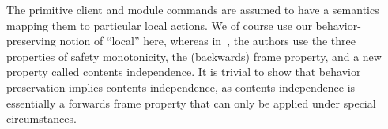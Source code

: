 \begin{comment}
\ifextended
In the language, we abstract out the syntax of the boolean expression type $B$, and
assume we have a denotational semantics for boolean expressions (written $\den{B}$) mapping
program states to boolean values. Furthermore, this semantics is required to have the 
following simple locality property:
\[\forall \sigma_0, \sigma_1 \such \sigma_0 \# \sigma_1 \Longrightarrow \den{B}(\sigma_0 \dt \sigma_1) = \den{B}\sigma_0\]
\fi
\end{comment}

The primitive client and module commands are assumed to have a semantics mapping them to particular local actions. We of course use our behavior-preserving
notion of ``local'' here, whereas in~\cite{filipovic10}, the authors use the three properties of safety monotonicity, the (backwards) frame property,
and a new property called contents independence. It is trivial to show that behavior preservation implies contents independence, as contents 
independence is essentially a forwards frame property that can only be applied under special circumstances.

\begin{comment}
We also assume we have a semantics for expressions and boolean expressions: $\den{E}$ has type $\Sigma \to \texttt{option int}$ and 
$\den{B}$ has type $\Sigma \to \texttt{option bool}$. Both of these semantics are required to be ``local'' in the following sense
($A$ is a placeholder for either $E$ or $B$):
\[\sigma_0 \# \sigma_1 \land \den{A}\sigma_0 \neq \none \Longrightarrow \den{A}(\sigma_0 \dt \sigma_1) = \den{A}\sigma_0\]
\end{comment}

\begin{comment}
\begin{figure}[t]
\begin{mathpar}

\hspace{-15mm}    
\begin{bnf}[r@{\ \ \ }c@{\ }]

\production{& E}
    \prodcase{0}
	\prodcase{1}
    \prodcase{\ldots}
    \prodcase{x}
    \prodcase{y}
    \prodcase{\ldots}
	\prodcase{E+E'}
	\prodcase{\ldots}
    
\production{& B}
    \prodcase{E=E'}
    \prodcase{\false}
    \prodcase{B \Rightarrow B'}
    
\production{& C}
    \prodcase{\skp}
    \prodcase{c}
    \prodcase{\texttt{m} \quad (\texttt{m} \in \textbf{MOp})}
    \prodcase{C;C'}
    \prodcase{\cond{B}{C}{C'}}
    \prodcase{\while{B}{C}}
    
\end{bnf}
\end{mathpar}

\caption{Language with Module Commands}
\label{modlang}
\vspace{3mm}
\hrule
\end{figure}

\end{comment}

